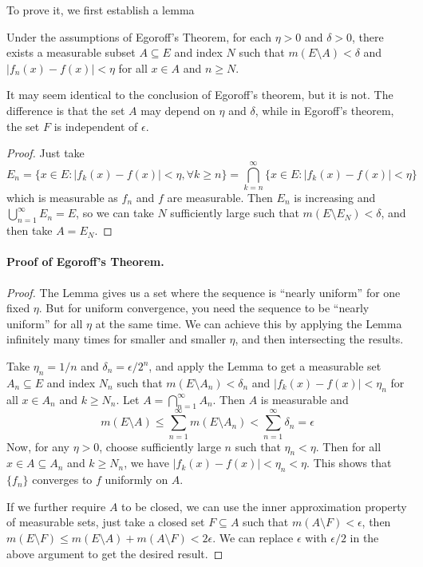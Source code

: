 \documentclass[../main.tex]{subfiles}
\begin{document}
To prove it, we first establish a lemma
\begin{proposition}{}{}
	Under the assumptions of Egoroff's Theorem, for each $\eta>0$ and $\delta > 0$, there exists a measurable subset $A \subseteq E$ and index $N$ such that $m(E \setminus A) < \delta$ and $|f_n(x) - f(x)| < \eta$ for all $x \in A$ and $n \geq N$.
\end{proposition}
\begin{remark}
	It may seem identical to the conclusion of Egoroff's theorem, but it is not. The difference is that the set $A$ may depend on $\eta$ and $\delta$, while in Egoroff's theorem, the set $F$ is independent of $\epsilon$.
\end{remark}
\begin{proof}
	Just take
	\begin{equation*}
		E_n = \{x \in E : |f_k(x) - f(x)| < \eta, \forall k \geq n\} = \bigcap_{k=n}^{\infty} \{x \in E : |f_k(x) - f(x)| < \eta\}
	\end{equation*}
	which is measurable as $f_n$ and $f$ are measurable. Then $E_n$ is increasing and $\bigcup_{n=1}^{\infty} E_n = E$, so we can take $N$ sufficiently large such that $m(E \setminus E_N) < \delta$, and then take $A = E_N$.
\end{proof}

\paragraph{Proof of Egoroff's Theorem.}
\begin{proof}
	The Lemma gives us a set where the sequence is ``nearly uniform'' for one fixed $\eta$. But for uniform convergence, you need the sequence to be ``nearly uniform'' for all $\eta$ at the same time. We can achieve this by applying the Lemma infinitely many times for smaller and smaller $\eta$, and then intersecting the results.

	Take $\eta_n = 1/n$ and $\delta_n = \epsilon/2^n$, and apply the Lemma to get a measurable set $A_n \subseteq E$ and index $N_n$ such that $m(E \setminus A_n) < \delta_n$ and $|f_k(x) - f(x)| < \eta_n$ for all $x \in A_n$ and $k \geq N_n$. Let $A = \bigcap_{n=1}^{\infty} A_n$. Then $A$ is measurable and
	\begin{equation*}
		m(E \setminus A) \leq \sum_{n=1}^{\infty} m(E \setminus A_n) < \sum_{n=1}^{\infty} \delta_n = \epsilon
	\end{equation*}
	Now, for any $\eta > 0$, choose sufficiently large $n$ such that $\eta_n < \eta$. Then for all $x \in A \subseteq A_n$ and $k \geq N_n$, we have $|f_k(x) - f(x)| < \eta_n < \eta$. This shows that $\{f_n\}$ converges to $f$ uniformly on $A$.

	If we further require $A$ to be closed, we can use the inner approximation property of measurable sets, just take a closed set $F \subseteq A$ such that $m(A \setminus F) < \epsilon$, then $m(E \setminus F) \leq m(E \setminus A) + m(A \setminus F) < 2\epsilon$. We can replace $\epsilon$ with $\epsilon/2$ in the above argument to get the desired result.
\end{proof}
\end{document}
